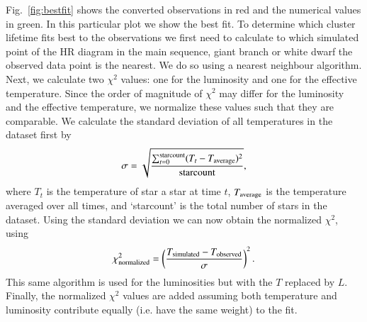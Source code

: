 \documentclass{aa}
\begin{document}
Fig.~\ref{fig:bestfit} shows the converted observations in red and the numerical values in green. In this particular plot we show the best fit. To determine which cluster lifetime fits best to the observations we first need to calculate to which simulated point of the HR diagram in the main sequence, giant branch or white dwarf the observed data point is the nearest. We do so using a nearest neighbour algorithm. Next, we calculate two $\chi^2$ values: one for the luminosity and one for the effective temperature. Since the order of magnitude of $\chi^2$ may differ for the luminosity and the effective temperature, we normalize these values such that they are comparable. We calculate the standard deviation of all temperatures in the dataset first by
\begin{eqnarray}
    \sigma = \sqrt{\frac{\sum_{t=0}^{\text{starcount}} (T_t - T_{\rm average})^2}{\text{starcount}}}, \label{eq:stdev} 
\end{eqnarray}where $T_t$ is the temperature of star a star at time $t$, $T_{\rm average}$ is the temperature averaged over all times, and `starcount' is the total number of stars in the dataset. Using the standard deviation we can now obtain the normalized $\chi^2$, using
\begin{eqnarray}
    \chi^2_{\rm normalized} = \left( \frac{T_{\rm simulated} - T_{\rm observed}}{\sigma} \right)^2.
\end{eqnarray}
This same algorithm is used for the luminosities but with the $T$ replaced by $L$. Finally, the normalized $\chi^2$ values are added assuming both temperature and luminosity contribute equally (i.e. have the same weight) to the fit.
\end{document}
